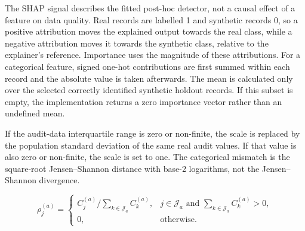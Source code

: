 
The SHAP signal describes the fitted post-hoc detector, not a causal effect
of a feature on data quality. Real records are labelled 1 and synthetic
records 0, so a positive attribution moves the explained output towards the
real class, while a negative attribution moves it towards the synthetic
class, relative to the explainer's reference. Importance uses the magnitude
of these attributions. For a categorical feature, signed one-hot
contributions are first summed within each record and the absolute value is
taken afterwards. The mean is calculated only over the selected correctly
identified synthetic holdout records. If this subset is empty, the
implementation returns a zero importance vector rather than an undefined mean.

If the audit-data interquartile range is zero or non-finite, the scale is
replaced by the population standard deviation of the same real audit values.
If that value is also zero or non-finite, the scale is set to one. The
categorical mismatch is the square-root Jensen--Shannon distance with
base-2 logarithms, not the Jensen--Shannon divergence.

\begin{equation}
    \rho_j^{(a)}=
    \begin{cases}
        C_j^{(a)}/\sum_{k\in\mathcal{J}_a}C_k^{(a)},
        & j\in\mathcal{J}_a\text{ and }\sum_{k\in\mathcal{J}_a}C_k^{(a)}>0,\\
        0, & \text{otherwise}.
    \end{cases}
\end{equation}

